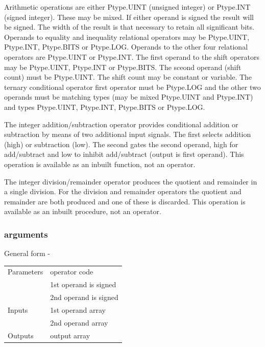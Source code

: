 \documentclass[10pt,a4paper,twoside,fleqn]{book}
\begin{document}
                    Arithmetic operations are either Ptype.UINT (unsigned integer)
                    or Ptype.INT (signed integer). These may be mixed. If either
                    operand is signed the result will be signed. The width of the
                    result is that necessary to retain all significant bits.
                    Operands to equality and inequality relational operators
                    may be Ptype.UINT, Ptype.INT, Ptype.BITS or Ptype.LOG.
                    Operands to the other four relational operators are
                    Ptype.UINT or Ptype.INT. The first operand to the shift
                    operators may be Ptype.UINT, Ptype.INT or Ptype.BITS. The
                    sceond operand (shift count) must be Ptype.UINT. The shift count
                    may be constant or variable. The ternary conditional operator
                    first operator must be Ptype.LOG and the other two operands
                    must be matching types (may be mixed Ptype.UINT and Ptype.INT)
                    and types Ptype.UINT, Ptype.INT, Ptype.BITS or Ptype.LOG.

                    The integer addition/subtraction operator provides conditional
                    addition or subtraction by means of two additional input
                    signals. The first selects addition (high) or subtraction (low).
                    The second gates the second operand, high for add/subtract
                    and low to inhibit add/subtract (output is first operand).
                    This operation is available as an inbuilt function, not an
                    operator.

                    The integer division/remainder operator produces the quotient and
                    remainder in a single division. For the division and remainder
                    operators the quotient and remainder are both produced and
                    one of these is discarded.
                    This operation is available as an inbuilt procedure, not an
                    operator.

                \subsubsection{arguments}
                
                    General form -

                    \begin{tabular}{| l | l |}
                    \hline
                    Parameters  & operator code \\
                                & 1st operand is signed \\
                                & 2nd operand is signed \\
                    \hline
                    Inputs      & 1st operand array \\
                                & 2nd operand array \\
                    \hline
                    Outputs     & output array \\
                    \hline
                    \end{tabular}
                    
\end{document}
